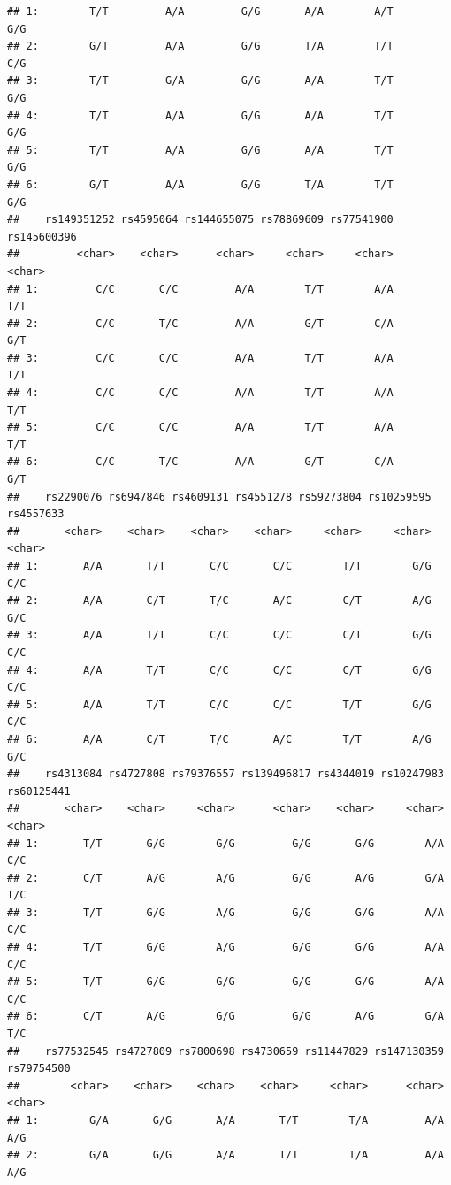 \documentclass[
]{article}
\begin{document}
\begin{verbatim}
## 1:        T/T         A/A         G/G       A/A        A/T        G/G
## 2:        G/T         A/A         G/G       T/A        T/T        C/G
## 3:        T/T         G/A         G/G       A/A        T/T        G/G
## 4:        T/T         A/A         G/G       A/A        T/T        G/G
## 5:        T/T         A/A         G/G       A/A        T/T        G/G
## 6:        G/T         A/A         G/G       T/A        T/T        G/G
##    rs149351252 rs4595064 rs144655075 rs78869609 rs77541900 rs145600396
##         <char>    <char>      <char>     <char>     <char>      <char>
## 1:         C/C       C/C         A/A        T/T        A/A         T/T
## 2:         C/C       T/C         A/A        G/T        C/A         G/T
## 3:         C/C       C/C         A/A        T/T        A/A         T/T
## 4:         C/C       C/C         A/A        T/T        A/A         T/T
## 5:         C/C       C/C         A/A        T/T        A/A         T/T
## 6:         C/C       T/C         A/A        G/T        C/A         G/T
##    rs2290076 rs6947846 rs4609131 rs4551278 rs59273804 rs10259595 rs4557633
##       <char>    <char>    <char>    <char>     <char>     <char>    <char>
## 1:       A/A       T/T       C/C       C/C        T/T        G/G       C/C
## 2:       A/A       C/T       T/C       A/C        C/T        A/G       G/C
## 3:       A/A       T/T       C/C       C/C        C/T        G/G       C/C
## 4:       A/A       T/T       C/C       C/C        C/T        G/G       C/C
## 5:       A/A       T/T       C/C       C/C        T/T        G/G       C/C
## 6:       A/A       C/T       T/C       A/C        T/T        A/G       G/C
##    rs4313084 rs4727808 rs79376557 rs139496817 rs4344019 rs10247983 rs60125441
##       <char>    <char>     <char>      <char>    <char>     <char>     <char>
## 1:       T/T       G/G        G/G         G/G       G/G        A/A        C/C
## 2:       C/T       A/G        A/G         G/G       A/G        G/A        T/C
## 3:       T/T       G/G        A/G         G/G       G/G        A/A        C/C
## 4:       T/T       G/G        A/G         G/G       G/G        A/A        C/C
## 5:       T/T       G/G        G/G         G/G       G/G        A/A        C/C
## 6:       C/T       A/G        G/G         G/G       A/G        G/A        T/C
##    rs77532545 rs4727809 rs7800698 rs4730659 rs11447829 rs147130359 rs79754500
##        <char>    <char>    <char>    <char>     <char>      <char>     <char>
## 1:        G/A       G/G       A/A       T/T        T/A         A/A        A/G
## 2:        G/A       G/G       A/A       T/T        T/A         A/A        A/G

\end{verbatim}
\end{document}
